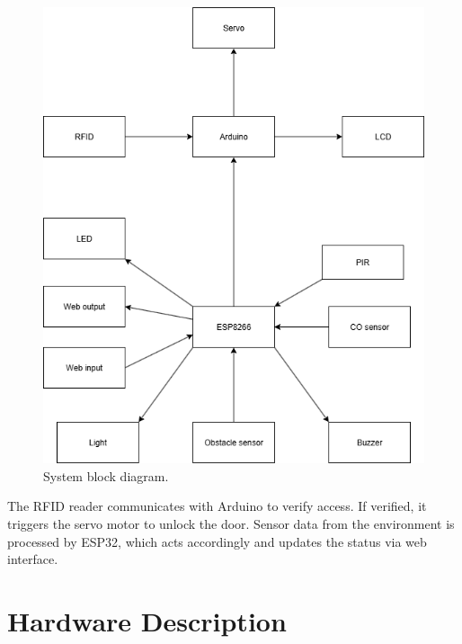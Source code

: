 \documentclass[conference, onecolumn]{IEEEtran}
\begin{document}
\begin{figure}[H]
\centering
\includegraphics[width=0.95\linewidth]{Block_diagram.png}
\caption{System block diagram.}
\label{fig:block}
\end{figure}

The RFID reader communicates with Arduino to verify access. If verified, it triggers the servo motor to unlock the door. Sensor data from the environment is processed by ESP32, which acts accordingly and updates the status via web interface.

\section{Hardware Description}
\end{document}
